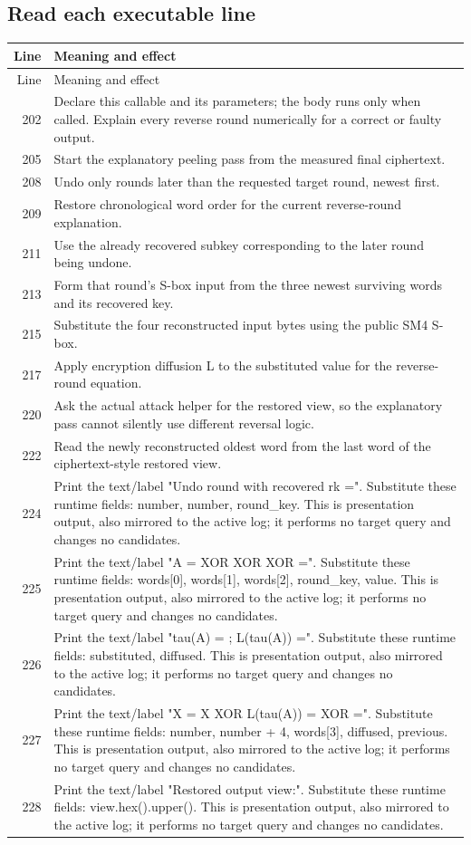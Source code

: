 \subsection*{Read each executable line}
\begingroup\small\begin{longtable}{r >{\raggedright\arraybackslash}p{138mm}}\toprule Line&Meaning and effect\\\midrule\endfirsthead\toprule Line&Meaning and effect\\\midrule\endhead
202&Declare this callable and its parameters; the body runs only when called. Explain every reverse round numerically for a correct or faulty output.\\
205&Start the explanatory peeling pass from the measured final ciphertext.\\
208&Undo only rounds later than the requested target round, newest first.\\
209&Restore chronological word order for the current reverse-round explanation.\\
211&Use the already recovered subkey corresponding to the later round being undone.\\
213&Form that round's S-box input from the three newest surviving words and its recovered key.\\
215&Substitute the four reconstructed input bytes using the public SM4 S-box.\\
217&Apply encryption diffusion L to the substituted value for the reverse-round equation.\\
220&Ask the actual attack helper for the restored view, so the explanatory pass cannot silently use different reversal logic.\\
222&Read the newly reconstructed oldest word from the last word of the ciphertext-style restored view.\\
224&Print the text/label "Undo round   with recovered rk =". Substitute these runtime fields: number, number, round\_key. This is presentation output, also mirrored to the active log; it performs no target query and changes no candidates.\\
225&Print the text/label "A =   XOR   XOR   XOR   =". Substitute these runtime fields: words[0], words[1], words[2], round\_key, value. This is presentation output, also mirrored to the active log; it performs no target query and changes no candidates.\\
226&Print the text/label "tau(A) =  ; L(tau(A)) =". Substitute these runtime fields: substituted, diffused. This is presentation output, also mirrored to the active log; it performs no target query and changes no candidates.\\
227&Print the text/label "X  = X  XOR L(tau(A)) =   XOR   =". Substitute these runtime fields: number, number + 4, words[3], diffused, previous. This is presentation output, also mirrored to the active log; it performs no target query and changes no candidates.\\
228&Print the text/label "Restored output view:". Substitute these runtime fields: view.hex().upper(). This is presentation output, also mirrored to the active log; it performs no target query and changes no candidates.\\
\bottomrule\end{longtable}\endgroup
